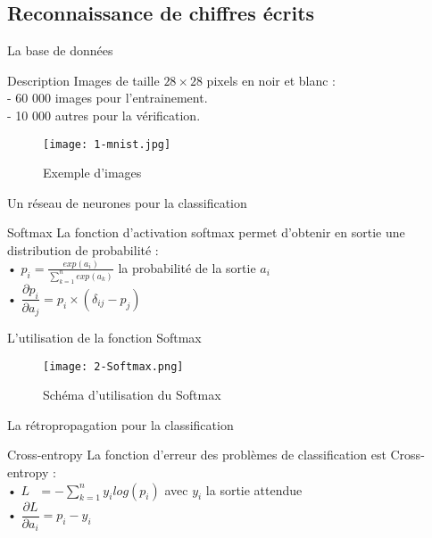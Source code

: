 \subsection{Reconnaissance de chiffres écrits}

\begin{frame}{La base de données}
	\begin{block}{Description}
		Images de taille $28 \times 28$ pixels en noir et blanc : \\
		\quad - 60 000 images pour l'entrainement. \\
		\quad - 10 000 autres pour la vérification.
	\end{block}
	\begin{figure}
		\centering
		\texttt{[image: 1-mnist.jpg]}
		\caption{Exemple d'images}
	\end{figure}
\end{frame}


\begin{frame}{Un réseau de neurones pour la classification}
	\begin{block}{Softmax}
		La fonction d'activation softmax permet d'obtenir en sortie une distribution de probabilité : \\
		• $p_i = \frac{exp(a_i)}{\sum_{k=1}^{n}exp(a_k)}$ la probabilité de la sortie $a_i$ \\
		• $\dfrac{\partial p_i}{\partial a_j} = p_i\times(\delta_{ij}-p_j)$ \\
	\end{block}
\end{frame}



\begin{frame}{L'utilisation de la fonction Softmax}
	\begin{figure}
		\centering
		\texttt{[image: 2-Softmax.png]}
		\caption{Schéma d'utilisation du Softmax}
	\end{figure}
\end{frame}


\begin{frame}{La rétropropagation pour la classification}
	\begin{block}{Cross-entropy}
		La fonction d'erreur des problèmes de classification est Cross-entropy : \\
		• $L\ \ \ = -\sum_{k=1}^{n}y_ilog(p_i)$ avec $y_i$ la sortie attendue \\
		• $\dfrac{\partial L}{\partial a_i} = p_i - y_i$
	\end{block}

\end{frame}

